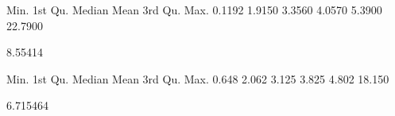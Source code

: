 \begin{Schunk}
\begin{Soutput}
   Min. 1st Qu.  Median    Mean 3rd Qu.    Max. 
 0.1192  1.9150  3.3560  4.0570  5.3900 22.7900 
\end{Soutput}
\begin{Soutput}
[1] 8.55414
\end{Soutput}
\begin{Soutput}
   Min. 1st Qu.  Median    Mean 3rd Qu.    Max. 
  0.648   2.062   3.125   3.825   4.802  18.150 
\end{Soutput}
\begin{Soutput}
[1] 6.715464
\end{Soutput}
\end{Schunk}
